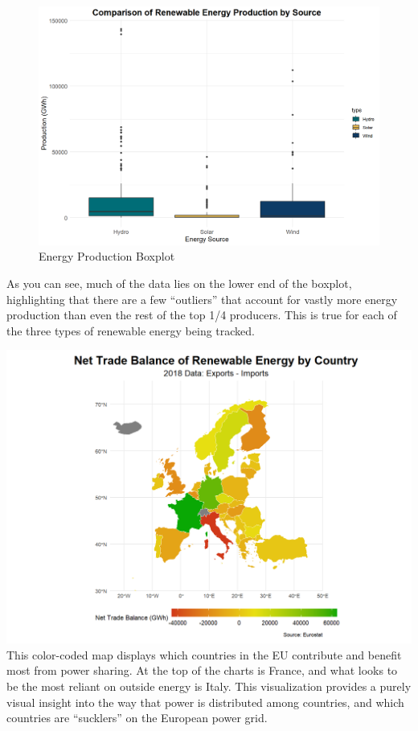 \documentclass[
  letterpaper,
  DIV=11,
  numbers=noendperiod]{scrartcl}
\begin{document}
\begin{figure}[H]

{\centering \includegraphics{../images/box_plot.png}

}

\caption{Energy Production Boxplot}

\end{figure}%

As you can see, much of the data lies on the lower end of the boxplot,
highlighting that there are a few ``outliers'' that account for vastly
more energy production than even the rest of the top 1/4 producers. This
is true for each of the three types of renewable energy being tracked.

\includegraphics{../images/net_trade_map.png} This color-coded map
displays which countries in the EU contribute and benefit most from
power sharing. At the top of the charts is France, and what looks to be
the most reliant on outside energy is Italy. This visualization provides
a purely visual insight into the way that power is distributed among
countries, and which countries are ``sucklers'' on the European power
grid.
\end{document}
